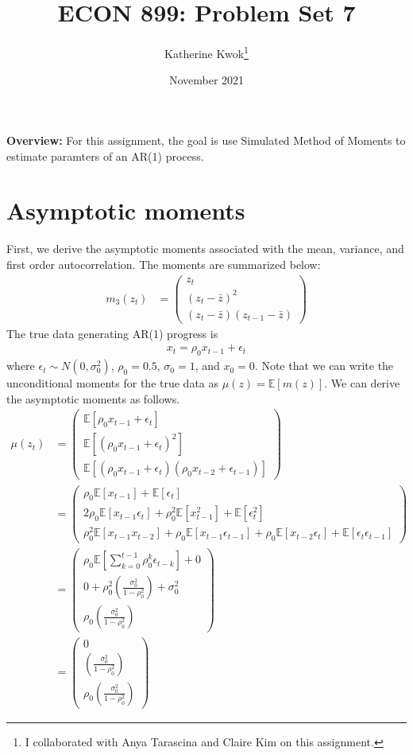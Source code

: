 \documentclass[12pt]{article}
\title{ECON 899: Problem Set 7}
\author{Katherine Kwok\footnote{I collaborated with Anya Tarascina and Claire Kim on this assignment.}}
\date{November 2021}
\newcommand{\E}{\mathbb{E}}
\begin{document}
\maketitle
\noindent \textbf{Overview:} For this assignment, the goal is use Simulated Method of Moments to estimate paramters of an AR(1) process. 
\section*{Asymptotic moments} 
First, we derive the asymptotic moments associated with the mean, variance, and first order autocorrelation. The moments are summarized below:
\begin{align*}
	m_3(z_t) &= \begin{pmatrix} z_t \\ (z_t - \bar{z})^2 \\ (z_t - \bar{z}) (z_{t-1} - \bar{z})\end{pmatrix}
\end{align*}
The true data generating AR(1) progress is 
\begin{align*}
	x_t = \rho_0 x_{t-1} + \epsilon_t
\end{align*}
where $\epsilon_t \sim N(0, \sigma_0^2)$, $\rho_0 = 0.5$, $\sigma_0 = 1$, and $x_0 = 0$.
Note that we can write the unconditional moments for the true data as $\mu(z) = \E[m(z)]$. We can derive the asymptotic moments as follows. 
\begin{align*}
\mu(z_t) &= \begin{pmatrix} \E[\rho_0 x_{t-1} + \epsilon_t] \\  \E[(\rho_0 x_{t-1} + \epsilon_t)^2] \\  \E[(\rho_0 x_{t-1} + \epsilon_t)(\rho_0 x_{t-2} + \epsilon_{t-1})]\end{pmatrix} \\
			  &= \begin{pmatrix} \rho_0 \E[x_{t-1}] + \E[\epsilon_t] \\ 2\rho_0 \E[x_{t-1}\epsilon_t] + \rho_0^2 \E[x_{t-1}^2] + \E[\epsilon_t^2] \\  \rho_0^2 \E[x_{t-1}x_{t-2}] + \rho_0\E[x_{t-1}\epsilon_{t-1}] + \rho_0\E[x_{t-2} \epsilon_t] + \E[\epsilon_t\epsilon_{t-1}] \end{pmatrix} \\
			  &= \begin{pmatrix} \rho_0 \E[\sum_{k = 0}^{t-1}\rho_0^k \epsilon_{t-k}] + 0 \\ 0 + \rho_0^2 (\frac{\sigma_0^2}{1-\rho_0^2}) + \sigma_0^2 \\  \rho_0 (\frac{\sigma_0^2}{1-\rho_0^2}) \end{pmatrix} \\
			  &= \begin{pmatrix} 0  \\   (\frac{\sigma_0^2}{1-\rho_0^2}) \\  \rho_0 (\frac{\sigma_0^2}{1-\rho_0^2}) \end{pmatrix}
\end{align*}
\end{document}
